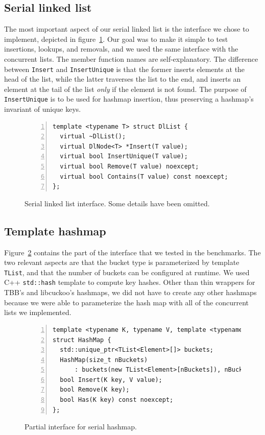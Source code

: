 \documentclass[11pt]{article}
\begin{document}
\subsection{Serial linked list}
The most important aspect of our serial linked list is the interface we chose to
implement, depicted in figure~\ref{fig:dllist}. Our goal was to make it simple
to test insertions, lookups, and removals, and we used the same interface with
the concurrent lists. The member function names are self-explanatory. The
difference between {\tt Insert} and {\tt InsertUnique} is that the former
inserts elements at the head of the list, while the latter traverses the list to
the end, and inserts an element at the tail of the list {\em only} if the
element is not found. The purpose of {\tt InsertUnique} is to be used for
hashmap insertion, thus preserving a hashmap's invariant of unique keys.

\begin{figure}[h]
\begin{center}
\begin{lstlisting}[numbers=left]
template <typename T> struct DlList {
  virtual ~DlList();
  virtual DlNode<T> *Insert(T value);
  virtual bool InsertUnique(T value);
  virtual bool Remove(T value) noexcept;
  virtual bool Contains(T value) const noexcept;
};
\end{lstlisting}
\caption{Serial linked list interface. Some details have been omitted.}
\label{fig:dllist}
\end{center}
\end{figure}

\subsection{Template hashmap}
Figure~\ref{fig:hashmap} contains the part of the interface that we tested in
the benchmarks. The two relevant aspects are that the bucket type is
parameterized by template {\tt TList}, and that the number of buckets can be
configured at runtime. We used C++ {\tt std::hash} template to compute key
hashes. Other than thin wrappers for TBB's and libcuckoo's hashmaps, we did not
have to create any other hashmaps because we were able to parameterize the hash
map with all of the concurrent lists we implemented.

\begin{figure}[h]
\begin{center}
\begin{lstlisting}[numbers=left]
template <typename K, typename V, template <typename> class TList>
struct HashMap {
  std::unique_ptr<TList<Element>[]> buckets;
  HashMap(size_t nBuckets)
      : buckets(new TList<Element>[nBuckets]), nBuckets(nBuckets) {}
  bool Insert(K key, V value);
  bool Remove(K key);
  bool Has(K key) const noexcept;
};
\end{lstlisting}
\caption{Partial interface for serial hashmap.}
\label{fig:hashmap}
\end{center}
\end{figure}
\end{document}
